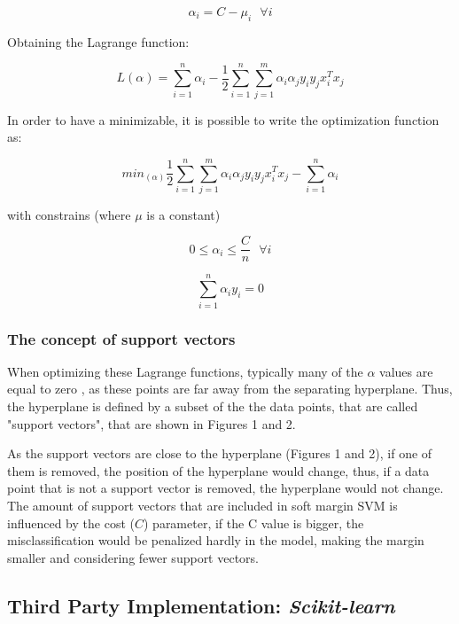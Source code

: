 \documentclass[11pt,twocolumn,letterpaper]{article}
\begin{document}
\begin{equation}
	\alpha_i = C - \mu_i \:\:\: \forall i
\end{equation}

Obtaining the Lagrange function:

\begin{equation}
	L(\alpha) = \sum_{i=1}^{n} \alpha_i - \frac{1}{2} \sum_{i=1}^{n} \sum_{j=1}^{m} \alpha_i \alpha_j y_i y_j x_i^T x_j
\end{equation}

In order to have a minimizable, it is possible to write the optimization function as:

\begin{equation}
	min_{(\alpha)} \frac{1}{2} \sum_{i=1}^{n} \sum_{j=1}^{m} \alpha_i \alpha_j y_i y_j x_i^T x_j - \sum_{i=1}^{n} \alpha_i
\end{equation}

with constrains (where $\mu$ is a constant)

\begin{equation}
	0 \leq \alpha_i \leq \frac{C}{n}   \:\:\: \forall i
\end{equation}

\begin{equation}
	\sum_{i=1}^{n} \alpha_i y_i = 0
\end{equation}

\subsubsection{The concept of support vectors}

When optimizing these Lagrange functions, typically many of the $\alpha$ values are equal to zero \cite{Hastie2009}, as these points are far away from the separating hyperplane. Thus, the hyperplane is defined by a subset of the the data points, that are called "support vectors", that are shown in Figures 1 and 2.

As the support vectors are close to the hyperplane (Figures 1 and 2), if one of them is removed, the position of the hyperplane would change, thus, if a data point that is not a support vector is removed, the hyperplane would not change. The amount of support vectors that are included in soft margin SVM is influenced by the cost ($C$) parameter, if the C value is bigger, the misclassification would be penalized hardly in the model, making the margin smaller and considering fewer support vectors.

\subsection{Third Party Implementation: \textit{Scikit-learn}}
\end{document}
